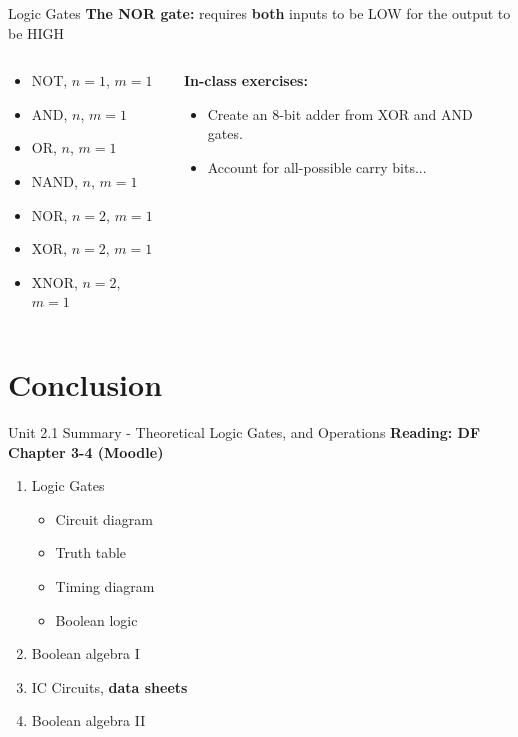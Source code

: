 \documentclass{beamer}
\begin{document}
\begin{frame}{Logic Gates}
\textbf{The NOR gate:} requires \textbf{both} inputs to be LOW for the output to be HIGH \\ \vspace{0.5cm}
\begin{columns}[T]
\begin{column}{0.5\textwidth}
\begin{itemize}
\item \alert{NOT, $n=1$, $m=1$}
\item \alert{AND, $n$, $m=1$}
\item \alert{OR, $n$, $m=1$}
\item \alert{NAND, $n$, $m=1$}
\item \alert{NOR, $n=2$, $m=1$}
\item \alert{XOR, $n=2$, $m=1$}
\item \alert{XNOR, $n=2$, $m=1$}
\end{itemize}
\end{column}
\begin{column}{0.5\textwidth}
\tiny
\textbf{In-class exercises:}
\begin{itemize}
\item Create an 8-bit adder from XOR and AND gates.
\item Account for all-possible carry bits...
\end{itemize}
\end{column}
\end{columns}
\end{frame}

\section{Conclusion}

\begin{frame}{Unit 2.1 Summary - Theoretical Logic Gates, and Operations}
\textbf{Reading: DF Chapter 3-4 (Moodle)}
\begin{enumerate}
\item Logic Gates
\begin{itemize}
\item Circuit diagram
\item Truth table
\item Timing diagram
\item Boolean logic
\end{itemize}
\item \alert{Boolean algebra I}
\item IC Circuits, \textbf{data sheets}
\item \alert{Boolean algebra II}
\end{enumerate}
\end{frame}
\end{document}
